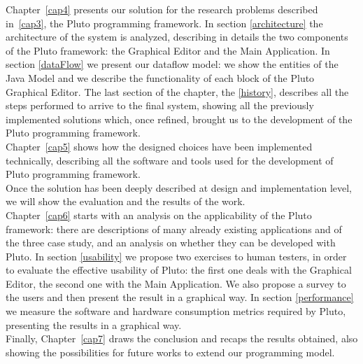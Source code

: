 Chapter~\ref{cap4} presents our solution for the research problems described in~\ref{cap3}, the Pluto programming framework.
In section \ref{architecture} the architecture of the system is analyzed, describing in details the two components of the Pluto framework:
the Graphical Editor and the Main Application.
In section \ref{dataFlow} we present our dataflow model:
we show the entities of the Java Model and we describe the functionality of each block of the Pluto Graphical Editor.
The last section of the chapter, the \ref{history}, describes all the steps performed to arrive to the final system, showing all the previously implemented solutions which, once refined, brought us to the development of the Pluto programming framework.
\\

Chapter~\ref{cap5} shows how the designed choices have been implemented technically, describing all the software and tools used for the development of Pluto programming framework.
\\

Once the solution has been deeply described at design and implementation level, we will show the evaluation and the results of the work.
\\

Chapter~\ref{cap6} starts with an analysis on the applicability of the Pluto framework:
there are descriptions of many already existing applications and of the three case study, and an analysis on whether they can be developed with Pluto. 
In section \ref{usability} we propose two exercises to human testers, in order to evaluate the effective usability of Pluto:
the first one deals with the Graphical Editor, the second one with the Main Application.
We also propose a survey to the users and then present the result in a graphical way.
In section \ref{performance} we measure the software and hardware consumption metrics required by Pluto, presenting the results in a graphical way.
\\

Finally, Chapter~\ref{cap7} draws the conclusion and recaps the results obtained, also showing the possibilities for future works to extend our programming model.